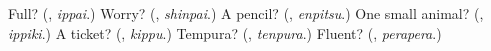 \begin{tcolorbox}[breakable,colback=teal!4,colframe=teal!35!black,title={Before you move on}]
Full? (\textbf{}, \emph{ippai}.) Worry? (\textbf{}, \emph{shinpai}.) A pencil? (\textbf{}, \emph{enpitsu}.) One small animal? (\textbf{}, \emph{ippiki}.) A ticket? (\textbf{}, \emph{kippu}.) Tempura? (\textbf{}, \emph{tenpura}.) Fluent? (\textbf{}, \emph{perapera}.)
\end{tcolorbox}
